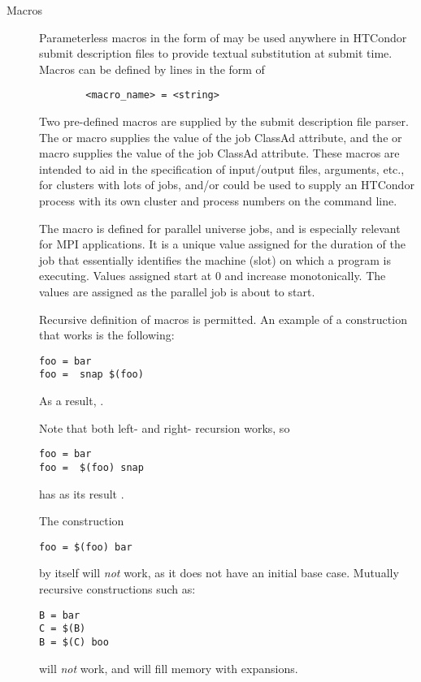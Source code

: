 \begin{description}

\item[Macros] Parameterless macros in the form of 
may be used anywhere in HTCondor submit description files
to provide textual substitution at submit time.
Macros can be defined by lines in the form of 
\begin{verbatim} 
        <macro_name> = <string> 
\end{verbatim} 
Two pre-defined macros are supplied by the submit description file parser.
The
  or  macro supplies the value of the
 job
ClassAd attribute, and the
  or  macro supplies the value of the
 job
ClassAd attribute.
These macros are
intended to aid in the specification of input/output files, arguments,
etc., for clusters with lots of jobs, and/or could be used to supply an
HTCondor process with its own cluster and process numbers on the command
line.

The  macro is defined for parallel universe jobs,
and is especially relevant for MPI applications.
It is a unique value assigned for the duration of the job
that essentially identifies the machine (slot) on which a program is
executing.
Values assigned start at 0 and increase monotonically.
The values are assigned as the parallel job is about to start.

Recursive definition of macros is permitted.
An example of a construction that works is the following: 
\begin{verbatim}
foo = bar
foo =  snap $(foo)
\end{verbatim}
As a result, .

Note that both left- and right- recursion works, so 
\begin{verbatim}
foo = bar
foo =  $(foo) snap
\end{verbatim}
has as its result .

The construction 
\begin{verbatim}
foo = $(foo) bar 
\end{verbatim}
by itself will \emph{not} work, as it does not have an initial base case.
Mutually recursive constructions such as: 
\begin{verbatim}
B = bar 
C = $(B)
B = $(C) boo
\end{verbatim}
will \emph{not} work, and will fill memory with expansions.


\end{description}
